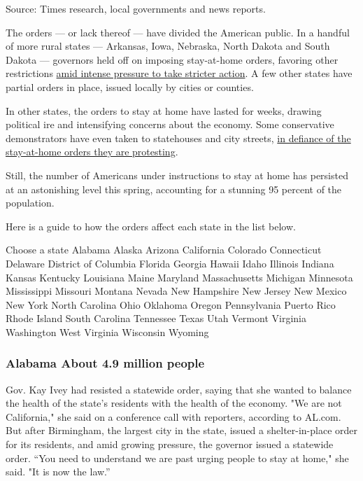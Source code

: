 Source: Times research, local governments and news reports.

The orders --- or lack thereof --- have divided the American public. In
a handful of more rural states --- Arkansas, Iowa, Nebraska, North
Dakota and South Dakota --- governors held off on imposing stay-at-home
orders, favoring other restrictions
\href{https://www.nytimes3xbfgragh.onion/2020/04/03/us/coronavirus-states-without-stay-home.html}{amid
intense pressure to take stricter action}. A few other states have
partial orders in place, issued locally by cities or counties.

In other states, the orders to stay at home have lasted for weeks,
drawing political ire and intensifying concerns about the economy. Some
conservative demonstrators have even taken to statehouses and city
streets,
\href{https://www.nytimes3xbfgragh.onion/2020/04/16/us/coronavirus-rules-protests.html}{in
defiance of the stay-at-home orders they are protesting}.

Still, the number of Americans under instructions to stay at home has
persisted at an astonishing level this spring, accounting for a stunning
95 percent of the population.

Here is a guide to how the orders affect each state in the list below.

Choose a state Alabama Alaska Arizona California Colorado Connecticut
Delaware District of Columbia Florida Georgia Hawaii Idaho Illinois
Indiana Kansas Kentucky Louisiana Maine Maryland Massachusetts Michigan
Minnesota Mississippi Missouri Montana Nevada New Hampshire New Jersey
New Mexico New York North Carolina Ohio Oklahoma Oregon Pennsylvania
Puerto Rico Rhode Island South Carolina Tennessee Texas Utah Vermont
Virginia Washington West Virginia Wisconsin Wyoming

\hypertarget{alabama-about-49-million-people}{%
\subsubsection{Alabama About 4.9 million
people}\label{alabama-about-49-million-people}}

Gov. Kay Ivey had resisted a statewide order, saying that she wanted to
balance the health of the state's residents with the health of the
economy. "We are not California," she said on a conference call with
reporters, according to AL.com. But after Birmingham, the largest city
in the state, issued a shelter-in-place order for its residents, and
amid growing pressure, the governor issued a statewide order. ``You need
to understand we are past urging people to stay at home," she said. "It
is now the law.''

